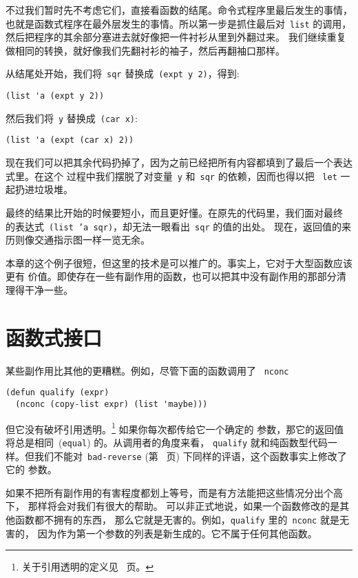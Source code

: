 不过我们暂时先不考虑它们，直接看函数的结尾。命令式程序里最后发生的事情，
也就是函数式程序在最外层发生的事情。所以第一步是抓住最后对~\texttt{list}
的调用，然后把程序的其余部分塞进去\pozhehao{}就好像把一件衬衫从里到外翻过来。
我们继续重复做相同的转换，就好像我们先翻衬衫的袖子，然后再翻袖口那样。

从结尾处开始，我们将~\texttt{sqr} 替换成~\texttt{(expt y 2)}，得到:
\begin{lstlisting}
(list 'a (expt y 2))
\end{lstlisting}
然后我们将~\texttt{y} 替换成~\texttt{(car x)}:
\begin{lstlisting}
(list 'a (expt (car x) 2))
\end{lstlisting}
现在我们可以把其余代码扔掉了，因为之前已经把所有内容都填到了最后一个表达式里。在这个
过程中我们摆脱了对变量~\texttt{y} 和~\texttt{sqr} 的依赖，因而也得以把
~\texttt{let} 一起扔进垃圾堆。

最终的结果比开始的时候要短小，而且更好懂。在原先的代码里，我们面对最终
的表达式~\texttt{(list 'a sqr)}，却无法一眼看出~\texttt{sqr} 的值的出处。
现在，返回值的来历则像交通指示图一样一览无余。

本章的这个例子很短，但这里的技术是可以推广的。事实上，它对于大型函数应该更有
价值。即使存在一些有副作用的函数，也可以把其中没有副作用的那部分清理得干净一些。

\section{函数式接口}
\label{sec:functional_interface}

某些副作用比其他的更糟糕。例如，尽管下面的函数调用了
~\texttt{nconc}
\begin{lstlisting}
(defun qualify (expr)
  (nconc (copy-list expr) (list 'maybe)))
\end{lstlisting}
但它没有破坏引用透明。\footnote{关于引用透明的定义见~\pageref{sec:referential_transparency} 页。} 如果你每次都传给它一个确定的
参数，那它的返回值将总是相同~(\texttt{equal}) 的。从调用者的角度来看，
\texttt{qualify} 就和纯函数型代码一样。但我们不能对~\texttt{bad-reverse}
(第~\pageref{fig:bad-reverse} 页) 下同样的评语，这个函数事实上修改了它的
参数。

如果不把所有副作用的有害程度都划上等号，而是有方法能把这些情况分出个高下，
那样将会对我们有很大的帮助。 
可以非正式地说，如果一个函数修改的是其他函数都不拥有的东西，
那么它就是无害的。例如，\texttt{qualify} 里的~\texttt{nconc} 就是无害的，
因为作为第一个参数的列表是新生成的。它不属于任何其他函数。

